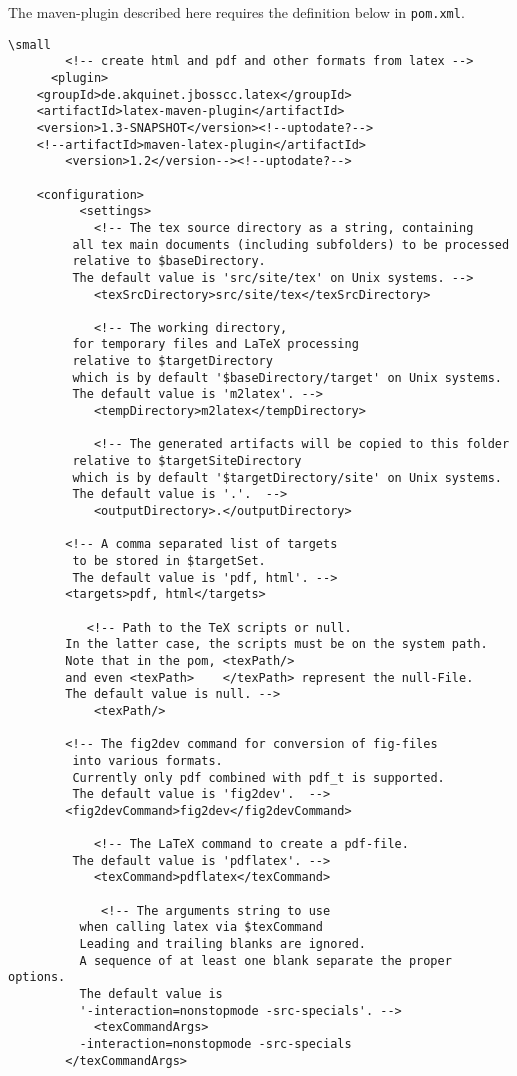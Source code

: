 \documentclass[12pt]{article}
\begin{document}
The maven-plugin described here 
requires the definition below in {\tt pom.xml}. 
\lstset{language=xml, basicstyle=\tiny}
\begin{lstlisting}
\small
        <!-- create html and pdf and other formats from latex -->
      <plugin>
	<groupId>de.akquinet.jbosscc.latex</groupId>
	<artifactId>latex-maven-plugin</artifactId>
	<version>1.3-SNAPSHOT</version><!--uptodate?-->
	<!--artifactId>maven-latex-plugin</artifactId>
	    <version>1.2</version--><!--uptodate?-->
	
	<configuration>
          <settings>
            <!-- The tex source directory as a string, containing 
		 all tex main documents (including subfolders) to be processed
		 relative to $baseDirectory. 
		 The default value is 'src/site/tex' on Unix systems. -->
            <texSrcDirectory>src/site/tex</texSrcDirectory>

            <!-- The working directory, 
		 for temporary files and LaTeX processing 
		 relative to $targetDirectory 
		 which is by default '$baseDirectory/target' on Unix systems. 
		 The default value is 'm2latex'. -->
            <tempDirectory>m2latex</tempDirectory>

            <!-- The generated artifacts will be copied to this folder 
		 relative to $targetSiteDirectory 
		 which is by default '$targetDirectory/site' on Unix systems. 
		 The default value is '.'.  -->
            <outputDirectory>.</outputDirectory>

	    <!-- A comma separated list of targets 
		 to be stored in $targetSet. 
		 The default value is 'pdf, html'. -->
	    <targets>pdf, html</targets>

           <!-- Path to the TeX scripts or null. 
		In the latter case, the scripts must be on the system path. 
		Note that in the pom, <texPath/> 
		and even <texPath>    </texPath> represent the null-File. 
		The default value is null. -->
            <texPath/> 

	    <!-- The fig2dev command for conversion of fig-files 
		 into various formats. 
		 Currently only pdf combined with pdf_t is supported. 
		 The default value is 'fig2dev'.  -->
	    <fig2devCommand>fig2dev</fig2devCommand>
  
            <!-- The LaTeX command to create a pdf-file. 
		 The default value is 'pdflatex'. -->
            <texCommand>pdflatex</texCommand>

             <!-- The arguments string to use 
		  when calling latex via $texCommand 
		  Leading and trailing blanks are ignored. 
		  A sequence of at least one blank separate the proper options. 
		  The default value is 
		  '-interaction=nonstopmode -src-specials'. -->
            <texCommandArgs>
	      -interaction=nonstopmode -src-specials
	    </texCommandArgs>


\end{lstlisting}
\end{document}
